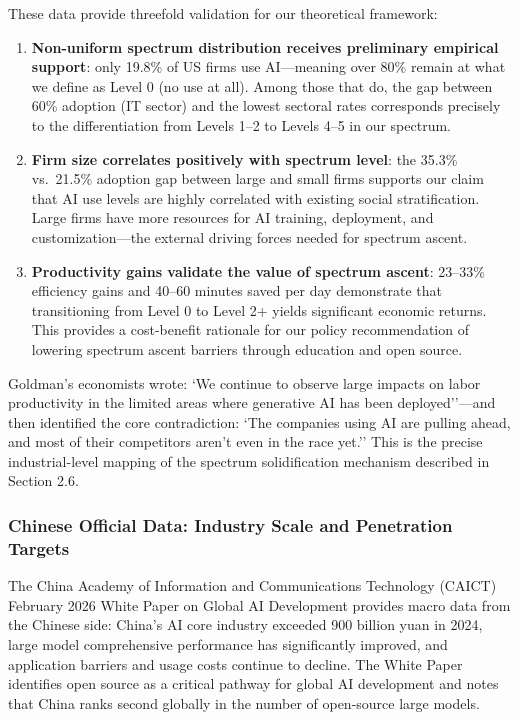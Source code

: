 These data provide threefold validation for our theoretical framework:

\begin{enumerate}
\item \textbf{Non-uniform spectrum distribution receives preliminary empirical support}: only 19.8\% of US firms use AI---meaning over 80\% remain at what we define as Level 0 (no use at all). Among those that do, the gap between 60\% adoption (IT sector) and the lowest sectoral rates corresponds precisely to the differentiation from Levels 1--2 to Levels 4--5 in our spectrum.
\item \textbf{Firm size correlates positively with spectrum level}: the 35.3\% vs.\ 21.5\% adoption gap between large and small firms supports our claim that AI use levels are highly correlated with existing social stratification. Large firms have more resources for AI training, deployment, and customization---the external driving forces needed for spectrum ascent.
\item \textbf{Productivity gains validate the value of spectrum ascent}: 23--33\% efficiency gains and 40--60 minutes saved per day demonstrate that transitioning from Level 0 to Level 2+ yields significant economic returns. This provides a cost-benefit rationale for our policy recommendation of lowering spectrum ascent barriers through education and open source.
\end{enumerate}

Goldman's economists wrote: `We continue to observe large impacts on labor productivity in the limited areas where generative AI has been deployed''---and then identified the core contradiction: `The companies using AI are pulling ahead, and most of their competitors aren't even in the race yet.'' This is the precise industrial-level mapping of the spectrum solidification mechanism described in Section 2.6.

\subsubsection{Chinese Official Data: Industry Scale and Penetration Targets}

The China Academy of Information and Communications Technology (CAICT) February 2026 White Paper on Global AI Development provides macro data from the Chinese side: China's AI core industry exceeded 900 billion yuan in 2024, large model comprehensive performance has significantly improved, and application barriers and usage costs continue to decline. The White Paper identifies open source as a critical pathway for global AI development and notes that China ranks second globally in the number of open-source large models.

